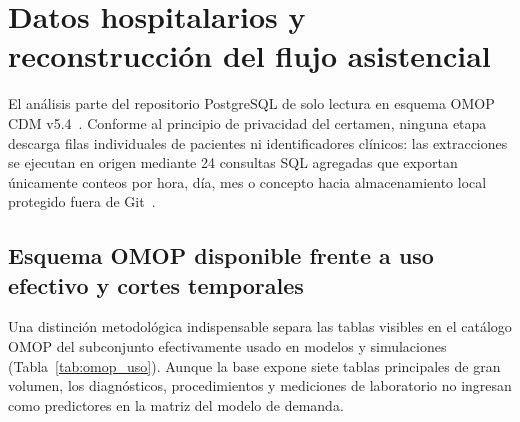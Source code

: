 
\section{Datos hospitalarios y reconstrucción del flujo asistencial}

El análisis parte del repositorio PostgreSQL de solo lectura en esquema OMOP CDM v5.4~\cite{ohdsi54,mediflow2026inventario}. Conforme al principio de privacidad del certamen, ninguna etapa descarga filas individuales de pacientes ni identificadores clínicos: las extracciones se ejecutan en origen mediante 24 consultas SQL agregadas que exportan únicamente conteos por hora, día, mes o concepto hacia almacenamiento local protegido fuera de Git~\cite{mediflow2026informe,mediflow2026auditoria}.

\subsection{Esquema OMOP disponible frente a uso efectivo y cortes temporales}

Una distinción metodológica indispensable separa las tablas visibles en el catálogo OMOP del subconjunto efectivamente usado en modelos y simulaciones (Tabla~\ref{tab:omop_uso}). Aunque la base expone siete tablas principales de gran volumen, los diagnósticos, procedimientos y mediciones de laboratorio no ingresan como predictores en la matriz del modelo de demanda.

